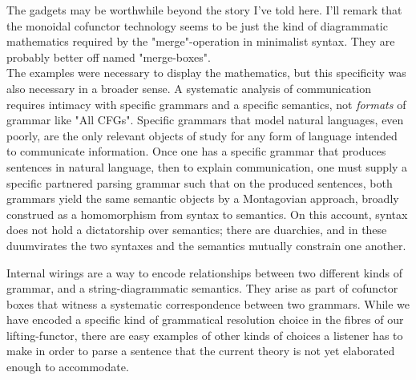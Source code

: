 The gadgets may be worthwhile beyond the story I've told here. I'll remark that the monoidal cofunctor technology seems to be just the kind of diagrammatic mathematics required by the "merge"-operation in minimalist syntax. They are probably better off named "merge-boxes".\\

The examples were necessary to display the mathematics, but this specificity was also necessary in a broader sense. A systematic analysis of communication requires intimacy with specific grammars and a specific semantics, not \emph{formats} of grammar like "All CFGs". Specific grammars that model natural languages, even poorly, are the only relevant objects of study for any form of language intended to communicate information. Once one has a specific grammar that produces sentences in natural language, then to explain communication, one must supply a specific partnered parsing grammar such that on the produced sentences, both grammars yield the same semantic objects by a Montagovian approach, broadly construed as a homomorphism from syntax to semantics. On this account, syntax does not hold a dictatorship over semantics; there are duarchies, and in these duumvirates the two syntaxes and the semantics mutually constrain one another.


Internal wirings are a way to encode relationships between two different kinds of grammar, and a string-diagrammatic semantics. They arise as part of cofunctor boxes that witness a systematic correspondence between two grammars. While we have encoded a specific kind of grammatical resolution choice in the fibres of our lifting-functor, there are easy examples of other kinds of choices a listener has to make in order to parse a sentence that the current theory is not yet elaborated enough to accommodate.

